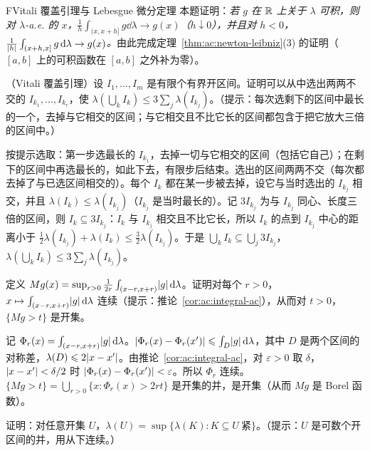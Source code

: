 
\begin{probleme}{F}{Vitali 覆盖引理与 Lebesgue 微分定理}
本题证明：\emph{若 $g$ 在 $\mathbb{R}$ 上关于 $\lambda$ 可积，则对 $\lambda$-a.e. 的 $x$，$\frac1h\int_{(x,x+h]}g\dd\lambda\to g(x)$（$h\downarrow0$），并且对 $h<0$，$\frac1{\lvert h\rvert}\int_{(x+h,x]}g\,\mathrm{d}\lambda\to g(x)$。}由此完成定理~\ref{thm:ac:newton-leibniz}(3) 的证明（$[a,b]$ 上的可积函数在 $[a,b]$ 之外补为零）。
\begin{questions}
\item （Vitali 覆盖引理）设 $I_1,\dots,I_m$ 是有限个有界开区间。证明可以从中选出两两不交的 $I_{k_1},\dots,I_{k_r}$，使 $\lambda(\bigcup_kI_k)\leqslant3\sum_j\lambda(I_{k_j})$。（提示：每次选剩下的区间中最长的一个，去掉与它相交的区间；与它相交且不比它长的区间都包含于把它放大三倍的区间中。）
\begin{solution}
按提示选取：第一步选最长的 $I_{k_1}$，去掉一切与它相交的区间（包括它自己）；在剩下的区间中再选最长的，如此下去，有限步后结束。选出的区间两两不交（每次都去掉了与已选区间相交的）。每个 $I_k$ 都在某一步被去掉，设它与当时选出的 $I_{k_j}$ 相交，并且 $\lambda(I_k)\leqslant\lambda(I_{k_j})$（$I_{k_j}$ 是当时最长的）。记 $3I_{k_j}$ 为与 $I_{k_j}$ 同心、长度三倍的区间，则 $I_k\subseteq3I_{k_j}$：$I_k$ 与 $I_{k_j}$ 相交且不比它长，所以 $I_k$ 的点到 $I_{k_j}$ 中心的距离小于 $\frac12\lambda(I_{k_j})+\lambda(I_k)\leqslant\frac32\lambda(I_{k_j})$。于是 $\bigcup_kI_k\subseteq\bigcup_j3I_{k_j}$，$\lambda(\bigcup_kI_k)\leqslant3\sum_j\lambda(I_{k_j})$。
\end{solution}
\item 定义 $Mg(x)=\sup_{r>0}\frac1{2r}\int_{(x-r,x+r)}\lvert g\rvert\,\mathrm{d}\lambda$。证明对每个 $r>0$，$x\mapsto\int_{(x-r,x+r)}\lvert g\rvert\,\mathrm{d}\lambda$ 连续（提示：推论~\ref{cor:ac:integral-ac}），从而对 $t>0$，$\{Mg>t\}$ 是开集。
\begin{solution}
记 $\Phi_r(x)=\int_{(x-r,x+r)}\lvert g\rvert\,\mathrm{d}\lambda$。$\lvert \Phi_r(x)-\Phi_r(x')\rvert\leqslant\int_{D}\lvert g\rvert\,\mathrm{d}\lambda$，其中 $D$ 是两个区间的对称差，$\lambda(D)\leqslant2\lvert x-x'\rvert$。由推论~\ref{cor:ac:integral-ac}，对 $\varepsilon>0$ 取 $\delta$，$\lvert x-x'\rvert<\delta/2$ 时 $\lvert \Phi_r(x)-\Phi_r(x')\rvert<\varepsilon$。所以 $\Phi_r$ 连续。$\{Mg>t\}=\bigcup_{r>0}\{x:\Phi_r(x)>2rt\}$ 是开集的并，是开集（从而 $Mg$ 是 Borel 函数）。
\end{solution}
\item 证明：对任意开集 $U$，$\lambda(U)=\sup\{\lambda(K):K\subseteq U\ \text{紧}\}$。（提示：$U$ 是可数个开区间的并，用从下连续。）

\end{questions}
\end{probleme}
